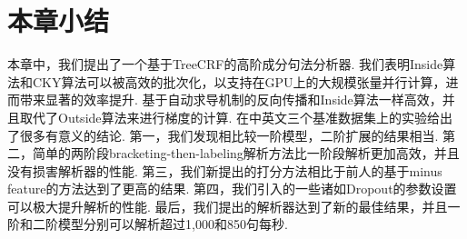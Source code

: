 \section{本章小结}\label{sec:con-conclusions}

本章中，我们提出了一个基于TreeCRF的高阶成分句法分析器.
我们表明Inside算法和CKY算法可以被高效的批次化，以支持在GPU上的大规模张量并行计算，进而带来显著的效率提升.
基于自动求导机制的反向传播和Inside算法一样高效，并且取代了Outside算法来进行梯度的计算.
在中英文三个基准数据集上的实验给出了很多有意义的结论.
第一，我们发现相比较一阶模型，二阶扩展的结果相当.
第二，简单的两阶段bracketing-then-labeling解析方法比一阶段解析更加高效，并且没有损害解析器的性能.
第三，我们新提出的打分方法相比于前人的基于minus feature的方法达到了更高的结果.
第四，我们引入的一些诸如Dropout的参数设置可以极大提升解析的性能.
最后，我们提出的解析器达到了新的最佳结果，并且一阶和二阶模型分别可以解析超过1,000和850句每秒.
